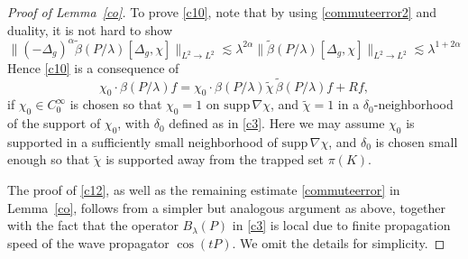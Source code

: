 \documentclass[10pt,a4paper]{amsart}
\newcommand{\la}{\lambda}
\newcommand{\supp}{\mathrm{supp }}
\begin{document}
\begin{proof}[Proof of Lemma~\ref{co}]
To prove \eqref{c10}, note that by using \eqref{commuteerror2} and duality, it is not hard to show 
$$\|(-\Delta_g)^\alpha\tilde\beta(P/\la)  [\Delta_g,\chi]\|_{L^2\to L^2}\lesssim \la^{2\alpha}\|\tilde\beta(P/\la)  [\Delta_g,\chi]\|_{L^2\to L^2} \lesssim \la^{1+2\alpha}$$
Hence \eqref{c10} is a consequence of 
\begin{equation}\label{c12}
\chi_0 \cdot \beta(P/\la)f
   =\chi_0 \cdot \beta(P/\la)\tilde\chi \,\tilde\beta(P/\la) f
+Rf,
\end{equation}
if $\chi_0\in C_0^\infty$ is chosen so that $\chi_0=1$ on $\supp\, \nabla\chi$, and $\tilde \chi=1$ in a $\delta_0$-neighborhood of the support of $\chi_0$, with $\delta_0$ defined as in \eqref{c3}. Here we may assume $\chi_0$ is supported in a sufficiently small neighborhood of $\supp\, \nabla\chi$, and 
 $\delta_0$ is chosen small enough so that $\tilde \chi$ is supported away from the trapped set $\pi(K)$.

The proof of \eqref{c12}, as well as the remaining estimate \eqref{commuteerror} in Lemma~\ref{co}, follows from a simpler but analogous argument as above, together with the fact that the operator $B_\la(P)$ in \eqref{c3} is local due to finite propagation speed of the wave propagator $\cos(tP)$. We omit the details for simplicity.
\end{proof}
\end{document}
